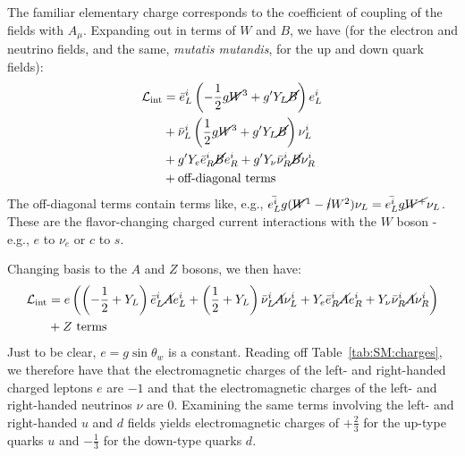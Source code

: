 The familiar elementary charge corresponds to the coefficient of coupling of the fields with $A_\mu$.
Expanding out in terms of $W$ and $B$, we have (for the electron and neutrino fields, and the same, \textit{mutatis mutandis}, for the up and down quark fields):
\begin{align}
  \mathcal{L}_\text{int} &= \bar{e}_L^i\left(-\frac{1}{2}g\cancel{W}^3+g'Y_L\cancel{B}\right)e_L^i\nonumber\\
              &+ \bar{\nu}_L^i\left(\frac{1}{2}g\cancel{W}^3+g'Y_L\cancel{B}\right)\nu_L^i\nonumber\\
              &+ g' Y_e \bar{e}_R^i\cancel{B}e_R^i +g' Y_\nu \bar{\nu}_R^i\cancel{B}\nu_R^i\nonumber\\
              &+ \text{off-diagonal terms}
\end{align}
The off-diagonal terms contain terms like, e.g., $\bar{e_L^i}g(\cancel{W}^1-\cancel{i}W^2)\nu_L = \bar{e_L^i}g\cancel{W^+}\nu_L$.
These are the flavor-changing charged current interactions with the $W$ boson - e.g., $e$ to $\nu_e$ or $c$ to $s$.

Changing basis to the $A$ and $Z$ bosons, we then have:
\begin{align}
  \mathcal{L}_\text{int} &= e\left(\left(-\frac{1}{2}+Y_L\right)\bar{e}^i_L\cancel{A}e^i_L
              + \left(\frac{1}{2}+Y_L\right)\bar{\nu}^i_L\cancel{A}\nu^i_L
              + Y_e \bar{e}^i_R\cancel{A}e^i_R + Y_\nu \bar{\nu}^i_R\cancel{A}\nu^i_R\right)\nonumber \\
              &+ \text{$Z$ terms}
\end{align}
Just to be clear, $e=g\sin\theta_w$ is a constant.
Reading off Table~\ref{tab:SM:charges}, we therefore have that the electromagnetic charges of the left- and right-handed charged leptons $e$ are $-1$ and that the electromagnetic charges of the left- and right-handed neutrinos $\nu$ are $0$.
Examining the same terms involving the left- and right-handed $u$ and $d$ fields yields electromagnetic charges of $+\frac{2}{3}$ for the up-type quarks $u$ and $-\frac{1}{3}$ for the down-type quarks $d$.

